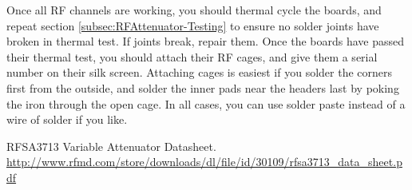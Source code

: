 \documentclass[letter,12pt]{article}
\begin{document}
Once all RF channels are working, you should thermal cycle the boards, and repeat section \ref{subsec:RFAttenuator-Testing} to ensure no solder joints have broken in thermal test. If joints break, repair them. Once the boards have passed their thermal test, you should attach their RF cages, and give them a serial number on their silk screen. Attaching cages is easiest if you solder the corners first from the outside, and solder the inner pads near the headers last by poking the iron through the open cage. In all cases, you can use solder paste instead of a wire of solder if you like.
\begin{thebibliography}{1}
RFSA3713 Variable Attenuator Datasheet. \href{http://www.rfmd.com/store/downloads/dl/file/id/30109/rfsa3713_data_sheet.pdf}{http://www.rfmd.com/store/downloads/dl/file/id/30109/rfsa3713\_{}data\_{}sheet.pdf}
\end{thebibliography}
\end{document}
